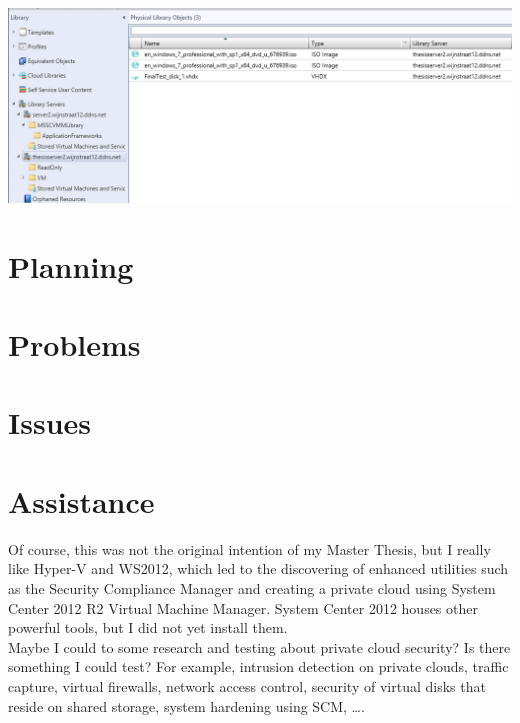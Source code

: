 \documentclass[11pt, a4paper]{article}
\begin{document}
\noindent\begin{minipage}{\textwidth}
    \centering
    \includegraphics[width=\textwidth]{Hosts_2.png}
\end{minipage}


\section*{Planning}



\section*{Problems}



\section*{Issues}



\section*{Assistance}

Of course, this was not the original intention of my Master Thesis, but I really like Hyper-V and WS2012, which led to the discovering of enhanced utilities such as the Security Compliance Manager and creating a private cloud using System Center 2012 R2 Virtual Machine Manager. System Center 2012 houses other powerful tools, but I did not yet install them. \\
Maybe I could to some research and testing about private cloud security? Is there something I could test? For example, intrusion detection on private clouds, traffic capture, virtual firewalls, network access control, security of virtual disks that reside on shared storage, system hardening using SCM, \ldots.
\end{document}
